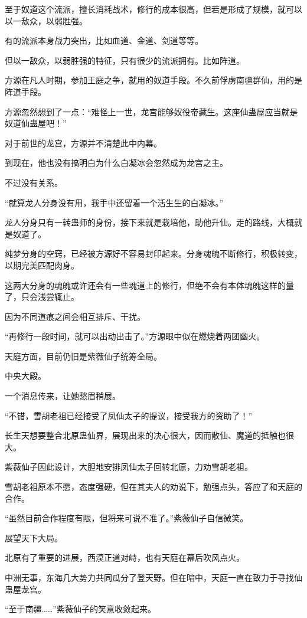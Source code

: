\begin{this_body}
至于奴道这个流派，擅长消耗战术，修行的成本很高，但若是形成了规模，就可以以一敌众，以弱胜强。

有的流派本身战力突出，比如血道、金道、剑道等等。

但以一敌众，以弱胜强的特征，只有很少的流派拥有。比如阵道。

方源在凡人时期，参加王庭之争，就用的奴道手段。不久前俘虏南疆群仙，用的是阵道手段。

方源忽然想到了一点：“难怪上一世，龙宫能够奴役帝藏生。这座仙蛊屋应当就是奴道仙蛊屋吧！”

对于前世的龙宫，方源并不清楚此中内幕。

到现在，他也没有搞明白为什么白凝冰会忽然成为龙宫之主。

不过没有关系。

“就算龙人分身没有用，我手中还留着一个活生生的白凝冰。”

龙人分身只有一转蛊师的身份，接下来就是栽培他，助他升仙。走的路线，大概就是奴道了。

纯梦分身的空窍，已经被方源好不容易封印起来。分身魂魄不断修行，积极转变，以期完美匹配肉身。

这两大分身的魂魄或许还会有一些魂道上的修行，但绝不会有本体魂魄这样的量了，只会浅尝辄止。

因为不同道痕之间会相互排斥、干扰。

“再修行一段时间，就可以出动出击了。”方源眼中似在燃烧着两团幽火。

天庭方面，目前仍旧是紫薇仙子统筹全局。

中央大殿。

一个消息传来，让她愁眉稍展。

“不错，雪胡老祖已经接受了凤仙太子的提议，接受我方的资助了！”

长生天想要整合北原蛊仙界，展现出来的决心很大，因而散仙、魔道的抵触也很大。

紫薇仙子因此设计，大胆地安排凤仙太子回转北原，力劝雪胡老祖。

雪胡老祖原本不愿，态度强硬，但在其夫人的劝说下，勉强点头，答应了和天庭的合作。

“虽然目前合作程度有限，但将来可说不准了。”紫薇仙子自信微笑。

展望天下大局。

北原有了重要的进展，西漠正道对峙，也有天庭在幕后吹风点火。

中洲无事，东海几大势力共同瓜分了登天野。但在暗中，天庭一直在致力于寻找仙蛊屋龙宫。

“至于南疆……”紫薇仙子的笑意收敛起来。


\end{this_body}

